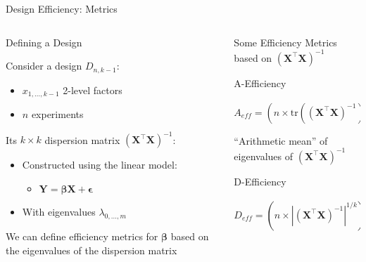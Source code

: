 \documentclass[10pt, compress, aspectratio=169, xcolor={table,usenames,dvipsnames}]{beamer}
\begin{document}
\begin{frame}[label={sec:org458d4d8}]{Design Efficiency: Metrics}
\addtocounter{framenumber}{-1}
\begin{columns}
\begin{column}{0.5\columnwidth}
\begin{block}{Defining a Design}
\vspace{.2cm}

Consider a design \(D_{n, k - 1}\):

\begin{itemize}
\item \(x_{1, \dots, k - 1}\) \alert{2-level factors}
\item \(n\) \alert{experiments}
\end{itemize}

Its \(k \times k\) \alert{dispersion matrix}
\(\left(\bm{X}^{\intercal}\bm{X}\right)^{-1}\):

\begin{itemize}
\item Constructed using the \alert{linear model}:
\begin{itemize}
\item \(\bm{Y} = \bm{\beta{}X} + \bm{\epsilon}\)
\end{itemize}
\item With \alert{eigenvalues} \(\lambda_{0,...,m}\)
\end{itemize}

We can define \alert{efficiency metrics} for \(\bm{\beta}\) based on the
\alert{eigenvalues} of the \alert{dispersion matrix}
\end{block}
\end{column}

\begin{column}{0.5\columnwidth}
\begin{block}{Some Efficiency Metrics based on \(\left(\bm{X}^{\intercal}\bm{X}\right)^{-1}\)}
\vspace{.2cm}
\begin{block}{A-Efficiency}
\vspace{-.6cm}
\begin{center}
\begin{equation*}
A_{eff} = \left(n \times \text{tr}\left(\left(\bm{X}^{\intercal}\bm{X}\right)^{-1}\right)/k\right)^{-1}, \; A_{eff} \in \left[0, 1\right]
\end{equation*}
\end{center}

\vspace{-.3cm}
\colorbox{Accent!25}{``Arithmetic mean'' of eigenvalues of \(\left(\bm{X}^{\intercal}\bm{X}\right)^{-1}\)}
\end{block}
\begin{block}{D-Efficiency}
\vspace{-.6cm}
\begin{center}
\begin{equation*}
D_{eff} = \left(n \times \left|\left(\bm{X}^{\intercal}\bm{X}\right)^{-1}\right|^{1/k}\right)^{-1}, \; D_{eff} \in \left[0, 1\right]
\end{equation*}
\end{center}


\end{block}
\end{block}
\end{column}
\end{columns}
\end{frame}
\end{document}
